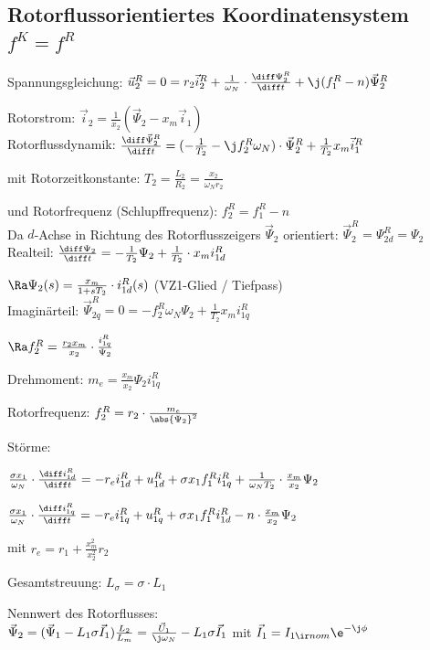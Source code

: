 \documentclass[german]{latex4ei_fs}
\begin{document}
\begin{sectionbox}
\subsection{Rotorflussorientiertes Koordinatensystem $f^K = f^R$}


Spannungsgleichung:
$\vec u_2^R = 0 = r_2 \vec i_2^R + \frac{1}{\omega_N} \cdot \frac{\diff \Psi_2^R}{\diff t} + \j (f_1^R - n) \vec \Psi_2^R$

Rotorstrom:
$\vec i_2 = \frac{1}{x_2} (\vec \Psi_2 - x_m \vec i_1)$ \\

Rotorflussdynamik:
$\frac{\diff \vec \Psi_2^R}{\diff t} = (- \frac{1}{T_2} - \j f_2^R \omega_N) \cdot \vec \Psi_2^R + \frac{1}{T_2} x_m \vec i_1^R$

mit Rotorzeitkonstante: $T_2 = \frac{L_2}{R_2} = \frac{x_2}{\omega_N r_2}$

und Rotorfrequenz (Schlupffrequenz): $f_2^R = f_1^R - n$ \\

Da $d$-Achse in Richtung des Rotorflusszeigers $\vec \Psi_2$ orientiert:
$\vec \Psi_2^R = \Psi_{2d}^R = \Psi_2$ \\

Realteil:
$\frac{\diff \Psi_2}{\diff t} = - \frac{1}{T_2} \Psi_2 + \frac{1}{T_2} \cdot x_m i_{1d}^R$

$\Ra \Psi_2(s) = \frac{x_m}{1 + s T_2} \cdot i_{1d}^R (s)$ (VZ1-Glied / Tiefpass) \\ 

Imaginärteil: 
$\vec \Psi_{2q}^R = 0 = - f_2^R \omega_N \Psi_2 + \frac{1}{T_2} x_m i_{1q}^R$

 $ \Ra f_2^R = \frac{r_2 x_m}{x_2} \cdot \frac{i_{1q}^R}{\Psi_2}$

 Drehmoment: $m_e = \frac{x_m}{x_2} \Psi_2 i_{1q}^R$

 Rotorfrequenz: $f_2^R = r_2 \cdot \frac{m_e}{\abs{\Psi_2}^2}$

Störme:

 $\frac{\sigma x_1}{\omega_N} \cdot \frac{\diff i_{1d}^R}{\diff t} = - r_e i_{1d}^R + u_{1d}^R + \sigma x_1 f_1^R i_{1q}^R + \frac{1}{\omega_N T_2} \cdot \frac{x_m}{x_2} \Psi_2$

  $\frac{\sigma x_1}{\omega_N} \cdot \frac{\diff i_{1q}^R}{\diff t} = - r_e i_{1q}^R + u_{1q}^R + \sigma x_1 f_1^R i_{1d}^R - n \cdot \frac{x_m}{x_2} \Psi_2$

  mit $r_e = r_1 + \frac{x_m^2}{x_2^2} r_2$

  Gesamtstreuung: $L_\sigma = \sigma \cdot L_1$

Nennwert des Rotorflusses: \\
$\vec \Psi_2 = (\vec \Psi_1 - L_1 \sigma \vec I_1) \frac{L_2}{L_m} = \frac{\vec U_1}{\j \omega_N} - L_1 \sigma \vec I_1$ mit $\vec I_1 = I_{1 \ir nom} \e^{-\j \phi}$

\end{sectionbox}
\end{document}
